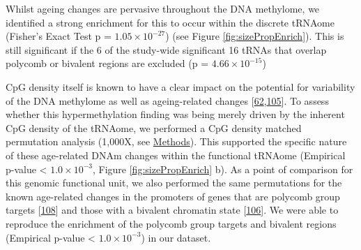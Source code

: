 \documentclass[
]{book}
\begin{document}
Whilst ageing changes are pervasive throughout the DNA methylome, we identified a strong enrichment for this to occur within the discrete tRNAome (Fisher's Exact Test p = \(1.05\times10^{-27}\)) (see Figure \ref{fig:sizePropEnrich}).
This is still significant if the 6 of the study-wide significant 16 tRNAs that overlap polycomb or bivalent regions are excluded (p = \(4.66\times10^{-15}\))

CpG density itself is known to have a clear impact on the potential for variability of the DNA methylome as well as ageing-related changes {[}\protect\hyperlink{ref-Ziller2013}{62},\protect\hyperlink{ref-Christensen2009}{105}{]}.
To assess whether this hypermethylation finding was being merely driven by the inherent CpG density of the tRNAome, we performed a CpG density matched permutation analysis (1,000X, see \protect\hyperlink{AgeErichmentPermutation}{Methods}).
This supported the specific nature of these age-related DNAm changes within the functional tRNAome (Empirical p-value \textless{} \(1.0\times10^{-3}\), Figure \ref{fig:sizePropEnrich} b).
As a point of comparison for this genomic functional unit, we also performed the same permutations for the known age-related changes in the promoters of genes that are polycomb group targets {[}\protect\hyperlink{ref-Teschendorff2010}{108}{]} and those with a bivalent chromatin state {[}\protect\hyperlink{ref-Rakyan2010}{106}{]}.
We were able to reproduce the enrichment of the polycomb group targets and bivalent regions (Empirical p-value \textless{} \(1.0\times10^{-3}\)) in our dataset.
\end{document}
